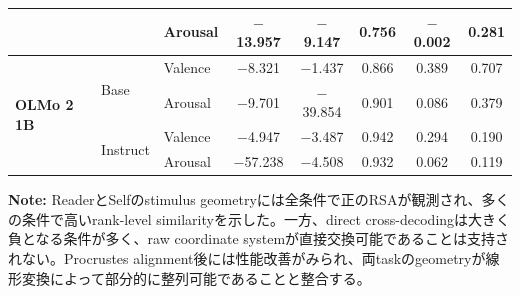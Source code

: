 \begin{table}[htbp]
\begin{tabular}{lll cccc c}
                                 &                    & Arousal  & $-$13.957    & $-$9.147     & 0.756      & $-$0.002   & 0.281      \\
\midrule
\multirow{4}{*}{\textbf{OLMo 2 1B}} & \multirow{2}{*}{Base} & Valence  & $-$8.321     & $-$1.437     & 0.866      & 0.389      & 0.707      \\
                                 &                    & Arousal  & $-$9.701     & $-$39.854    & 0.901      & 0.086      & 0.379      \\
\cmidrule(lr){2-8}
                                 & \multirow{2}{*}{Instruct} & Valence  & $-$4.947     & $-$3.487     & 0.942      & 0.294      & 0.190      \\
                                 &                    & Arousal  & $-$57.238    & $-$4.508     & 0.932      & 0.062      & 0.119      \\
\bottomrule
\end{tabular}
\vspace{1ex}
\begin{minipage}{\linewidth}
\footnotesize
\textbf{Note:} ReaderとSelfのstimulus geometryには全条件で正のRSAが観測され、多くの条件で高いrank-level similarityを示した。一方、direct cross-decodingは大きく負となる条件が多く、raw coordinate systemが直接交換可能であることは支持されない。Procrustes alignment後には性能改善がみられ、両taskのgeometryが線形変換によって部分的に整列可能であることと整合する。
\end{minipage}
\end{table}

